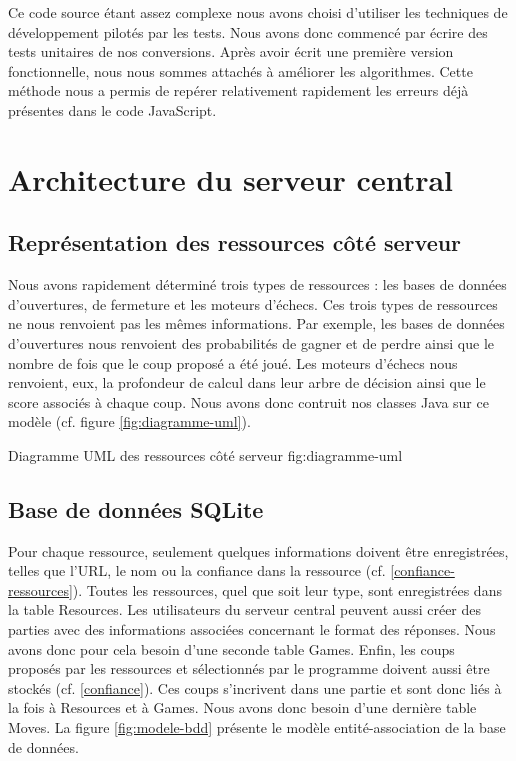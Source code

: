 \documentclass[a4paper,11pt]{article}
\begin{document}
Ce code source étant assez complexe nous avons choisi d'utiliser les techniques de développement pilotés par les tests. Nous avons donc commencé par écrire des tests unitaires de nos conversions. Après avoir écrit une première version fonctionnelle, nous nous sommes attachés à améliorer les algorithmes. Cette méthode nous a permis de repérer relativement rapidement les erreurs déjà présentes dans le code JavaScript.


\section{Architecture du serveur central}

\subsection{Représentation des ressources côté serveur}
\label{types-ressources}
Nous avons rapidement déterminé trois types de ressources : les bases de données d'ouvertures, de fermeture et les moteurs d'échecs.
Ces trois types de ressources ne nous renvoient pas les mêmes informations. Par exemple, les bases de données d'ouvertures nous renvoient des probabilités de gagner et de perdre ainsi que le nombre de fois que le coup proposé a été joué. Les moteurs d'échecs nous renvoient, eux, la profondeur de calcul dans leur arbre de décision ainsi que le score associés à chaque coup.
Nous avons donc contruit nos classes Java sur ce modèle (cf. figure \ref{fig:diagramme-uml}).

{Diagramme UML des ressources côté serveur}   
{fig:diagramme-uml}

\subsection{Base de données SQLite}
Pour chaque ressource, seulement quelques informations doivent être enregistrées, telles que l'URL, le nom ou la confiance dans la ressource (cf. \ref{confiance-ressources}). Toutes les ressources, quel que soit leur type, sont enregistrées dans la table Resources. Les utilisateurs du serveur central peuvent aussi créer des parties avec des informations associées concernant le format des réponses. Nous avons donc pour cela besoin d'une seconde table Games. Enfin, les coups proposés par les ressources et sélectionnés par le programme doivent aussi être stockés (cf. \ref{confiance}). Ces coups s'incrivent dans une partie et sont donc liés à la fois à Resources et à Games. Nous avons donc besoin d'une dernière table Moves. La figure \ref{fig:modele-bdd} présente le modèle entité-association de la base de données.
\end{document}
